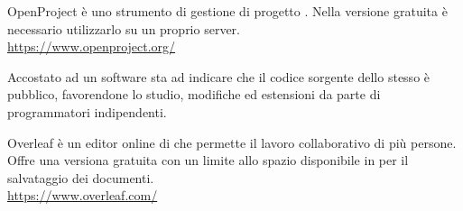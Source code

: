 OpenProject è uno strumento di gestione di progetto . Nella versione gratuita è necessario utilizzarlo su un proprio server.\\
\url{https://www.openproject.org/}

Accostato ad un software sta ad indicare che il codice sorgente dello stesso è pubblico, favorendone lo studio, modifiche ed estensioni da parte di programmatori indipendenti.

Overleaf è un editor online di  che permette il lavoro collaborativo di più persone. Offre una versiona gratuita con un limite allo spazio disponibile in  per il salvataggio dei documenti.\\
\url{https://www.overleaf.com/}
\clearpage